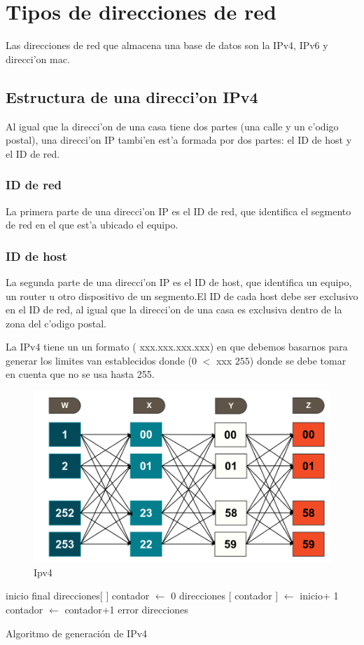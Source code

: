 \section{Tipos de direcciones de red}
Las direcciones de red que almacena una base de datos son la IPv4, IPv6 y direcci'on mac.
\subsection{Estructura de una direcci'on IPv4}
Al igual que la direcci'on de una casa tiene dos partes (una calle y un c'odigo postal), una direcci'on IP tambi'en est'a formada por dos partes: el ID de host y el ID de red.
\subsubsection{ID de red}
La primera parte de una direcci'on IP es el ID de red, que identifica el segmento de red en el que est'a ubicado el equipo.
\subsubsection{ID de host}
La segunda parte de una direcci'on IP es el ID de host, que identifica un equipo, un router u otro dispositivo de un segmento.El ID de cada host debe ser exclusivo en el ID de red, al igual que la direcci'on de una casa es exclusiva dentro de la zona del c'odigo postal.

La IPv4 tiene un un formato ( xxx.xxx.xxx.xxx) en que debemos basarnos para generar los limites van establecidos donde (0 $<$ xxx $255$) donde se debe tomar en cuenta que no se usa hasta 255.  
\begin{figure}[H]
\centering
\includegraphics[scale=0.4]{images/ipv4.png}
\caption{Ipv4}
\end{figure}
\begin{algorithm}[H]
\begin{algorithmic}[1]
\REQUIRE inicio final
\STATE direcciones$[$ $]$
\STATE contador $\leftarrow$ 0
	\STATE direcciones $[$ contador $]$ $\leftarrow$ inicio+ 1
	\STATE contador $\leftarrow$ contador+1
	\ENDWHILE
\ELSE
	\RETURN error
\ENDIF
\RETURN direcciones
\end{algorithmic}
\caption{Algoritmo de generaci\'on de IPv4}\label{alg:algoritmoGeneracionIPv4}
\end{algorithm}